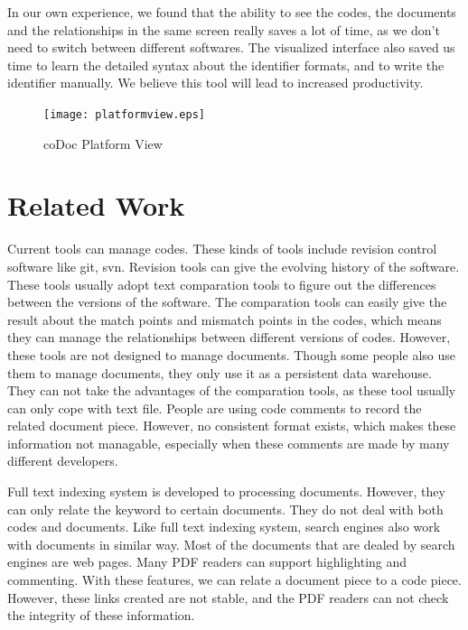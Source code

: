 \documentclass[11pt,letterpaper,oneside]{article}
\begin{document}
In our own experience, we found that the ability to see the codes, 
the documents and the relationships in the same screen really saves a lot of time,
as we don't need to switch between different softwares.
The visualized interface also saved us time to learn the detailed syntax about the identifier formats,
and to write the identifier manually.
We believe this tool will lead to increased productivity.

\begin{figure}
\begin{center}
\texttt{[image: platformview.eps]}
\caption{coDoc Platform View}
\label{fig:platformview}
\end{center}
\end{figure}


\section{Related Work}
\label{sec:related}
Current tools can manage codes. 
These kinds of tools include revision control software like git, svn. 
Revision tools can give the evolving history of the software.
These tools usually adopt text comparation tools to figure out the differences between the versions of the software.
The comparation tools can easily give the result about the match points and mismatch points in the codes,
which means they can manage the relationships between different versions of codes.
However, these tools are not designed to manage documents.
Though some people also use them to manage documents,
they only use it as a persistent data warehouse.
They can not take the advantages of the comparation tools, 
as these tool usually can only cope with text file.
People are using code comments to record the related document piece.
However, no consistent format exists,
which makes these information not managable,
especially when these comments are made by many different developers.

Full text indexing system is developed to processing documents.
However, they can only relate the keyword to certain documents.
They do not deal with both codes and documents. 
Like full text indexing system,
search engines also work with documents in similar way.
Most of the documents that are dealed by search engines are web pages.
Many PDF readers can support highlighting and commenting.
With these features, we can relate a document piece to a code piece.
However, these links created are not stable,
and the PDF readers can not check the integrity of these information.
\end{document}
